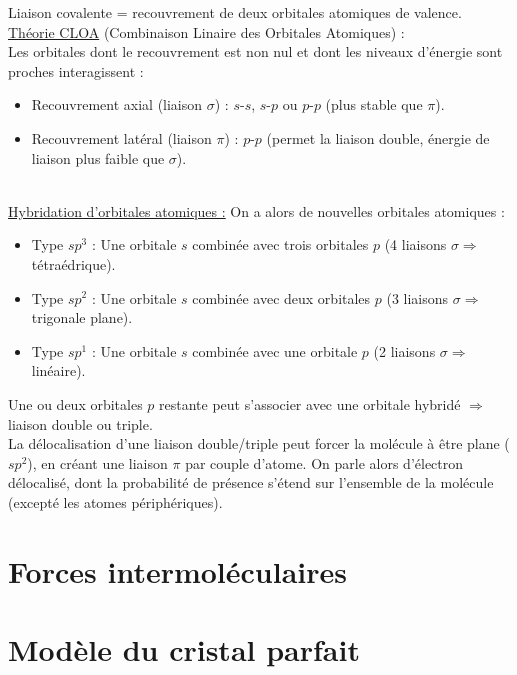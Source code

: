 \documentclass[13pt, twoside, a4paper, french, tikz]{report}
\begin{document}
    Liaison covalente = recouvrement de deux orbitales atomiques de valence.\\
    
    \underline{Théorie CLOA} (Combinaison Linaire des Orbitales Atomiques) :\\
    
    Les orbitales dont le recouvrement est non nul et dont les niveaux d'énergie sont proches interagissent :
    \begin{itemize}
      \item Recouvrement axial (liaison $\sigma$) : $s$-$s$, $s$-$p$ ou $p$-$p$ (plus stable que $\pi$).
      \item Recouvrement latéral (liaison $\pi$) : $p$-$p$ (permet la liaison double, énergie de liaison plus faible que $\sigma$).
    \end{itemize}
    \ \\
    \underline{Hybridation d'orbitales atomiques :} On a alors de nouvelles orbitales atomiques :
    \begin{itemize}
      \item Type $sp^3$ : Une orbitale $s$ combinée avec trois orbitales $p$ (4 liaisons $\sigma \Rightarrow$ tétraédrique).
      \item Type $sp^2$ : Une orbitale $s$ combinée avec deux orbitales $p$ (3 liaisons $\sigma \Rightarrow$ trigonale plane).
      \item Type $sp^1$ : Une orbitale $s$ combinée avec une orbitale $p$ (2 liaisons $\sigma \Rightarrow$ linéaire).
    \end{itemize}
    Une ou deux orbitales $p$ restante peut s'associer avec une orbitale hybridé $\Rightarrow$ liaison double ou triple.\\
    
    La délocalisation d'une liaison double/triple peut forcer la molécule à être plane ($sp^2$), en créant une liaison $\pi$ par couple d'atome.
    On parle alors d'électron délocalisé, dont la probabilité de présence s'étend sur l'ensemble de la molécule (excepté les atomes périphériques).


\chapter{Forces intermoléculaires}\label{ch:forces-intermoleculaires}


\chapter{Modèle du cristal parfait}\label{ch:modele-du-cristal-parfait}
\end{document}

